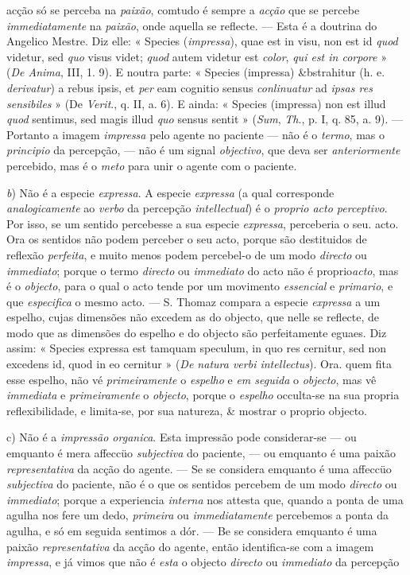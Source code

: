 acção só se perceba na \emph{paixão}, comtudo é sempre a \emph{acção} que se percebe \emph{immediatamente} na \emph{paixão}, onde aquella se reflecte. --- Esta é a doutrina do Angelico Mestre. Diz elle: « Species (\emph{impressa}), quae est in visu, non est id \emph{quod} videtur, sed \emph{quo} visus videt; \emph{quod} autem videtur est \emph{color}, \emph{qui est in corpore} » (\emph{De Anima}, III, 1. 9). E noutra parte: « Species (impressa) \&bstrahitur (h. e. \emph{derivatur}) a rebus ipsis, et \emph{per} eam cognitio sensus \emph{conlinuatur} ad \emph{ipsas res sensibiles} » (De \emph{Verit}., q. II, a. 6). E ainda: « Species (impressa) non est illud \emph{quod} sentimus, sed magis illud \emph{quo} sensus sentit » (\emph{Sum}, \emph{Th}., p. I, q. 85, a. 9). --- Portanto a imagem \emph{impressa} pelo agente no paciente --- não é o \emph{termo}, mas o \emph{principio} da percepção, --- não é um signal \emph{objectivo}, que deva ser \emph{anteriormente} percebido, mas é o \emph{meto} para unir o agente com o paciente.\par \emph{b}) Não é a especie \emph{expressa}. A especie \emph{expressa} (a qual corresponde \emph{analogicamente} ao \emph{verbo} da percepção \emph{intellectual}) é o \emph{proprio acto perceptivo}. Por isso, se um sentido percebesse a sua especie \emph{expressa}, perceberia o seu. acto. Ora os sentidos não podem perceber o seu acto, porque são destituidos de reflexão \emph{perfeita}, e muito menos podem percebel-o de um modo \emph{directo} ou \emph{immediato}; porque o termo \emph{directo} ou \emph{immediato} do acto não é proprio\emph{acto}, mas é o \emph{objecto}, para o qual o acto tende por um movimento \emph{essencial} e \emph{primario}, e que \emph{especifica} o mesmo acto. --- S. Thomaz compara a especie \emph{expressa} a um espelho, cujas dimensões não excedem as do objecto, que nelle se reflecte, de modo que as dimensões do espelho e do objecto são perfeitamente eguaes. Diz assim: « Species expressa est tamquam speculum, in quo res cernitur, sed non excedens id, quod in eo cernitur » (\emph{De natura verbi intellectus}). Ora. quem fita esse espelho, não vé \emph{primeiramente} o \emph{espelho} e \emph{em seguida} o \emph{objecto}, mas vê \emph{immediata} e \emph{primeiramente} o \emph{objecto}, porque o \emph{espelho} occulta-se na sua propria reflexibilidade, e limita-se, por sua natureza, \& mostrar o proprio objecto.\par c) Não é a \emph{impressão organica}. Esta impressão pode considerar-se --- ou emquanto é mera affeccüo \emph{subjectiva} do paciente, --- ou emquanto é uma paixão \emph{representativa} da acção do agente. --- Se se considera emquanto é uma affeccüo \emph{subjectiva} do paciente, não é o que os sentidos percebem de um modo \emph{directo} ou \emph{immediato}; porque a experiencia \emph{interna} nos attesta que, quando a ponta de uma agulha nos fere um dedo, \emph{primeira} ou \emph{immediatamente} percebemos a ponta da agulha, e só em seguida sentimos a dór. --- Be se considera emquanto é uma paixão \emph{representativa} da acção do agente, então identifica-se com a imagem \emph{impressa}, e já vimos que não é \emph{esta} o objecto \emph{directo} ou \emph{immediato} da percepção 